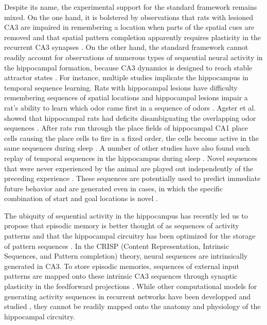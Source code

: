 \documentclass[utf8]{frontiersSCNS} %
\begin{document}
Despite its name, the experimental support for the standard framework remains mixed. On the one hand, it is bolstered by observations that rats with lesioned CA3 are impaired in remembering a location when parts of the spatial cues are removed \citep{gold2005role} and that spatial pattern completion apparently requires plasticity in the recurrent CA3 synapses \citep{nakazawa2002requirement}. On the other hand, the standard framework cannot readily account for observations of numerous types of sequential neural activity in the hippocampal formation, because CA3 dynamics is designed to reach stable attractor states \citep{cheng2013crisp}. 
For instance, multiple studies implicate the hippocampus in temporal sequence learning. Rats with hippocampal lesions have difficulty remembering sequences of spatial locations \citep{chiba1994memory} and hippocampal lesions impair a rat's ability to learn which odor came first in a sequence of odors \citep{fortin2002critical}. Agster et al. showed that hippocampal rats had deficits disambiguating the overlapping odor sequences \citep{agster2002hippocampus}. After rats run through the place fields of hippocampal CA1 place cells causing the place cells to fire in a fixed order, the cells become active in the same sequences during sleep \citep{lee2002memory}. A number of other studies have also found such replay of temporal sequences in the hippocampus during sleep \citep{louie2001temporally, kudrimoti1999reactivation, qin1997memory, skaggs1996replay}. Novel sequences that were never experienced by the animal are played out independently of the preceding experience \citep{gupta2010hippocampal, dragoi2011preplay}. These sequences are potentially used to predict immediate future behavior and are generated even in cases, in which the specific combination of start and goal locations is novel \citep{pfeiffer2013hippocampal}. 

The ubiquity of sequential activity in the hippocampus has recently led us to propose that episodic memory is better thought of as sequences of activity patterns 
\citep{cheng2016dissociating, suddendorf2007evolution} 
and that the hippocampal circuitry has been optimized for the storage of pattern sequences \citep{cheng2013crisp}. 
In the CRISP (Content Representation, Intrinsic Sequences, and Pattern completion) theory, neural sequences are intrinsically generated in CA3. To store episodic memories, sequences of external input patterns are mapped onto these intrinsic CA3 sequences through synaptic plasticity in the feedforward projections \citep[e.g.][]{willshaw1969non}.
While other computational models for generating activity sequences in recurrent networks have been developped and studied \citep{sussillo2009generating, lazar2009sorn, rajan2016recurrent, jaeger2001echo, kropff2007complexity, bayati2015self}, they cannot be readily mapped onto the anatomy and physiology of the hippocampal circuitry.
\end{document}
